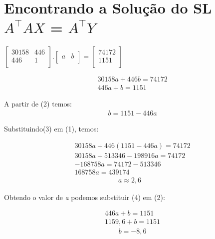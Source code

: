 \documentclass{article}
\begin{document}
\section{Encontrando a Solução do SL $A^\top AX$ = $A^\top Y$}
    \begin{center}
        $\begin{bmatrix}
        30158 & 446 \\
        446 & 1 \\
        \end{bmatrix}
        .
        \begin{bmatrix}
        a & b \\
        \end{bmatrix}
        =
        \begin{bmatrix}
        74172 \\
        1151 \\
        \end{bmatrix}$
    \end{center}
    \begin{align}
        &30158\textit{a} + 446\textit{b} = 74172 \\
        &446\textit{a} + \textit{b} = 1151
    \end{align}
    
    A partir de (2) temos:
    \begin{align}
        &\textit{b} = 1151 - 446\textit{a}
    \end{align}
    
    Substituindo(3) em (1), temos:
    \begin{center}
        \begin{align*}
            &30158\textit{a} + 446(1151 - 446\textit{a}) = 74172 \\
            &30158\textit{a} + 513346 - 198916\textit{a} = 74172 \\
            &-168758\textit{a} = 74172 - 513346 \\
            &168758\textit{a} = 439174       
        \end{align*}
        \begin{align}
            \textit{a} \approx 2,6
        \end{align}
    \end{center}
    \newpage
    
    Obtendo o valor de \textit{a} podemos substituir (4) em (2):
    \begin{center}
        \begin{align*}
            &446\textit{a} + \textit{b} = 1151 \\
            &1159,6 + \textit{b} = 1151
        \end{align*}
            \begin{align}
                &\textit{b} = -8,6
            \end{align}
    \end{center}
    
\end{document}
